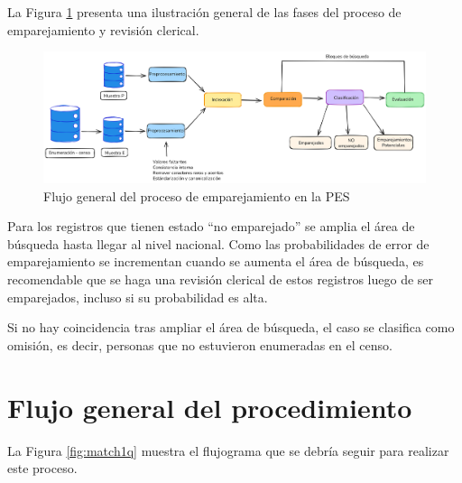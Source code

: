 \documentclass[
  12pt,
]{book}
\begin{document}
La Figura \ref{fig:match} presenta una ilustración general de las fases del proceso de emparejamiento y revisión clerical.

\begin{figure}

{\centering \includegraphics[width=1\linewidth]{images/FlujoMatch} 

}

\caption{Flujo general del proceso de emparejamiento en la PES}\label{fig:match}
\end{figure}

Para los registros que tienen estado ``no emparejado'' se amplia el área de búsqueda hasta llegar al nivel nacional. Como las probabilidades de error de emparejamiento se incrementan cuando se aumenta el área de búsqueda, es recomendable que se haga una revisión clerical de estos registros luego de ser emparejados, incluso si su probabilidad es alta.

Si no hay coincidencia tras ampliar el área de búsqueda, el caso se clasifica como omisión, es decir, personas que no estuvieron enumeradas en el censo.

\section{Flujo general del procedimiento}\label{flujo-general-del-procedimiento}

La Figura \ref{fig:match1q} muestra el flujograma que se debría seguir para realizar este proceso.
\end{document}
